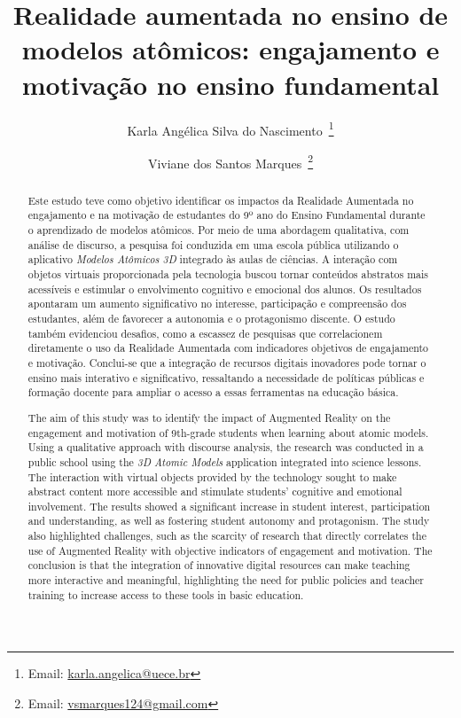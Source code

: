 \documentclass[portuguese]{textolivre}
\title{Realidade aumentada no ensino de modelos atômicos: engajamento e motivação no ensino fundamental}
\author[1]{Karla Angélica Silva do Nascimento~\orcid{0000-0001-6103-2397}\thanks{Email: \href{mailto:karla.angelica@uece.br}{karla.angelica@uece.br}}}
\author[2]{Viviane dos Santos Marques~\orcid{0000-0003-0692-0548}\thanks{Email: \href{mailto:vsmarques124@gmail.com}{vsmarques124@gmail.com}}}
\affil[1]{Universidade Estadual do Ceará, Faculdade de Educação e Ciências Integradas do Sertão de Canindé, Programa de Pós-Graduação em Educação, Fortaleza, Ceará, Brasil.}
\affil[2]{Rede Municipal de Ensino, Meruoca, Ceará, Brasil.}
\begin{document}
\maketitle

\begin{polyabstract}
\begin{abstract}
Este estudo teve como objetivo identificar os impactos da Realidade Aumentada no engajamento e na motivação de estudantes do 9º ano do Ensino Fundamental durante o aprendizado de modelos atômicos. Por meio de uma abordagem qualitativa, com análise de discurso, a pesquisa foi conduzida em uma escola pública utilizando o aplicativo \emph{Modelos Atômicos 3D} integrado às aulas de ciências. A interação com objetos virtuais proporcionada pela tecnologia buscou tornar conteúdos abstratos mais acessíveis e estimular o envolvimento cognitivo e emocional dos alunos. Os resultados apontaram um aumento significativo no interesse, participação e compreensão dos estudantes, além de favorecer a autonomia e o protagonismo discente. O estudo também evidenciou desafios, como a escassez de pesquisas que correlacionem diretamente o uso da Realidade Aumentada com indicadores objetivos de engajamento e motivação. Conclui-se que a integração de recursos digitais inovadores pode tornar o ensino mais interativo e significativo, ressaltando a necessidade de políticas públicas e formação docente para ampliar o acesso a essas ferramentas na educação básica.

\end{abstract}

\begin{english}
\begin{abstract}
The aim of this study was to identify the impact of Augmented Reality on the engagement and motivation of 9th-grade students when learning about atomic models. Using a qualitative approach with discourse analysis, the research was conducted in a public school using the \emph{3D Atomic Models} application integrated into science lessons. The interaction with virtual objects provided by the technology sought to make abstract content more accessible and stimulate students' cognitive and emotional involvement. The results showed a significant increase in student interest, participation and understanding, as well as fostering student autonomy and protagonism. The study also highlighted challenges, such as the scarcity of research that directly correlates the use of Augmented Reality with objective indicators of engagement and motivation. The conclusion is that the integration of innovative digital resources can make teaching more interactive and meaningful, highlighting the need for public policies and teacher training to increase access to these tools in basic education.

\end{abstract}
\end{english}
\end{polyabstract}
\end{document}
